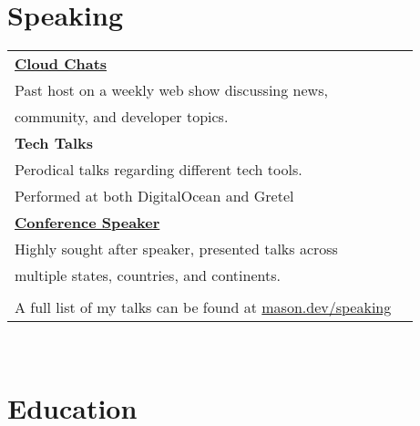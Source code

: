 \documentclass[10pt]{article} %
\newcommand\tab[1][1cm]{\hspace*{#1}}
\begin{document}
\begin{minipage}[t]{0.44\textwidth} %
\vspace{0pt} %


\section{Speaking} 

\begin{tabular}{ll}

\textbf{\href{https://www.digitalocean.com/community/pages/cloud-chats}{Cloud Chats}} \\
\tab Past host on a weekly web show discussing news, \\
\tab community, and developer topics.\\

\textbf{Tech Talks} \\
\tab Perodical talks regarding different tech tools. \\
\tab Performed at both DigitalOcean and Gretel\\

\textbf{\href{https://mason.dev/speaking}{Conference Speaker}} \\
\tab Highly sought after speaker, presented talks across \\ 
\tab multiple states, countries, and continents. \\
\\

A full list of my talks can be found at \href{https://mason.dev/speaking}{mason.dev/speaking}\\

\end{tabular}\\



\section{Education} 

\begin{tabular}{ll} %


\end{tabular}
\end{minipage}
\end{document}
